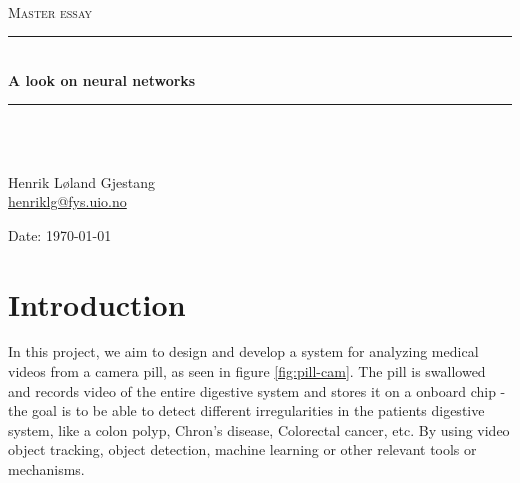 \documentclass[english, a4paper]{report}
\begin{document}
\begin{titlepage}
\begin{center}

\textsc{}\\[1.0cm]
\textsc{\Large Master essay}\\[0.5cm]
\rule{\linewidth}{0.5mm} \\[0.4cm]
{ \huge \bfseries A look on neural networks}\\[0.10cm]
\rule{\linewidth}{0.5mm} \\[1.5cm]
\textsc{}\\[7.0cm]

\begin{minipage}{0.69\textwidth}
    \begin{center} \large
        Henrik Løland Gjestang\\ \url{henriklg@fys.uio.no} \\[0.8cm]
    \end{center}
\end{minipage}
\vfill

\large{Date: \today}
\end{center}
\end{titlepage}


\tableofcontents
\newpage




\section{Introduction}

In this project, we aim to design and develop a system for analyzing medical videos from a camera pill, as seen in figure \ref{fig:pill-cam}. The pill is swallowed and records video of the entire digestive system and stores it on a onboard chip - the goal is to be able to detect different irregularities in the patients digestive system, like a colon polyp, Chron's disease, Colorectal cancer, etc. By using video object tracking, object detection, machine learning or other relevant tools or mechanisms.
\end{document}
